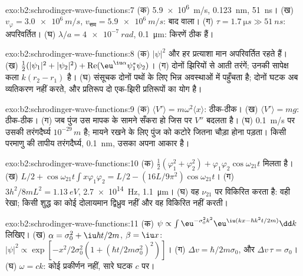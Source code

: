 \begin{solution}{exo:b2:schrodinger-wave-functions:7}
(क) \qty{5.9e6}{m/s}, \qty{0.123}{nm}, \qty{51}{ns}। (ख) $v_\varphi = \qty{3.0e6}{m/s}$,
$v_{\text{सम}} = \qty{5.9e6}{m/s}$: बाद वाला। (ग) $\tau = \qty{1.7}{\micro s} \gg
\qty{51}{ns}$: अपरिवर्तित। (घ) $\lambda/a = \qty{4e-7}{rad}$, \qty{0.1}{\micro m}:
किरणें ठीक हैं।
\end{solution}

\begin{solution}{exo:b2:schrodinger-wave-functions:8}
(क) $|\psi|^2$ और हर प्रत्याशा मान अपरिवर्तित रहते हैं। (ख) $\tfrac12(|\psi_1|^2
+ |\psi_2|^2) + \operatorname{Re}(\eu^{\iu\alpha}\psi_1^*\psi_2)$। (ग) दोनों झिरियों से आती
तरंगें; उनकी सापेक्ष कला $k(r_2 - r_1)$ है। (घ) संसूचक
दोनों पथों के लिए भिन्न अवस्थाओं में पहुँचता है; दोनों घटक अब
व्यतिकरण नहीं करते, और प्रतिरूप दो एक-झिरी प्रतिरूपों
का योग है।
\end{solution}

\begin{solution}{exo:b2:schrodinger-wave-functions:9}
(क) $\langle V'\rangle = m\omega^2\langle x\rangle$: ठीक-ठीक। (ख) $\langle V'\rangle
= mg$: ठीक-ठीक। (ग) जब पुंज उस मापक के सामने सँकरा हो जिस पर
$V''$ बदलता है। (घ) \qty{0.1}{m/s} पर उसकी तरंगदैर्घ्य $10^{-29}\,\unit{m}$ है;
मायने रखने के लिए पुंज को कटोरे जितना चौड़ा होना पड़ता। किसी परमाणु की
तापीय तरंगदैर्घ्य, \qty{0.1}{nm}, उसका अपना आकार है।
\end{solution}

\begin{solution}{exo:b2:schrodinger-wave-functions:10}
(क) $\tfrac12(\varphi_1^2 + \varphi_2^2) + \varphi_1\varphi_2\cos\omega_{21}t$ मिलता है। (ख) $L/2 +
\cos\omega_{21}t\int x\varphi_1\varphi_2 = L/2 - (16L/9\pi^2)\cos\omega_{21}t$। (ग)
$3h^2/8mL^2 = \qty{1.13}{eV}$, \qty{2.7e14}{Hz}, \qty{1.1}{\micro m}। (घ) वह
$\nu_{21}$ पर विकिरित करता है: वही रेखा; किसी शुद्ध  का कोई दोलायमान
द्विध्रुव नहीं और वह विकिरित नहीं करती।
\end{solution}

\begin{solution}{exo:b2:schrodinger-wave-functions:11}
(क) $\psi \propto \int\eu^{-\sigma_0^2k^2}\eu^{\iu(kx - \hbar k^2t/2m)}\dd k$ लिखिए। (ख) $\alpha =
\sigma_0^2 + \iu\hbar t/2m$, $\beta = \iu x$: $|\psi|^2 \propto \exp[-x^2/2\sigma_0^2(1 +
(\hbar t/2m\sigma_0^2)^2)]$। (ग) $\Delta v = \hbar/2m\sigma_0$, और $\Delta v\,\tau =
\sigma_0$। (घ) $\omega = ck$: कोई प्रकीर्णन नहीं, सारे घटक $c$ पर।
\end{solution}

